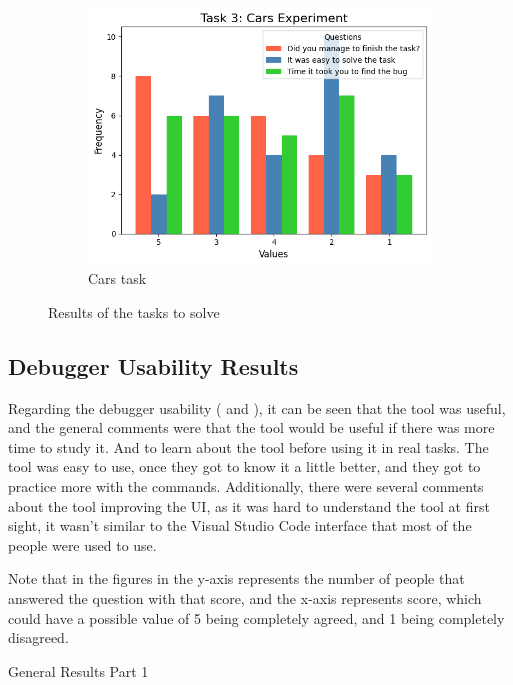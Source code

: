\begin{figure}[hptb]
\begin{subfigure}[b]{0.32\textwidth}
        \includegraphics[width=\textwidth]{figures/task3}
        \caption{Cars task}
        \label{fig:task3}
    \end{subfigure}
    \caption{Results of the tasks to solve}
    \label{fig:general-know}
\end{figure}


\subsection{Debugger Usability Results}
\label{sec:usability}

Regarding the debugger usability ( and ), it can 
be seen that the tool was useful,
and the general comments were that the tool would be useful if there was more time to study it. 
And to learn about the tool before using it in real tasks. The 
tool was easy to use, once they got to know it a little better, and they got to practice more with the commands.
Additionally, there were several comments about the tool improving the UI,
as it was hard to understand the tool at first sight, it wasn't similar to the Visual Studio Code 
interface that most of the people were used to use.

Note that in the figures in  the y-axis represents the number of people 
that answered the question with that score, and the x-axis represents score, which could have a 
possible value of 5 being completely agreed, and 1 being completely disagreed.

\begin{table}[H]
  \centering
  \caption{General Results Part 1}
  
  \label{tab:general1-debuggers}
\end{table}

